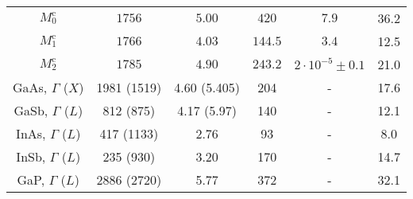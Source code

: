 \begin{table}
\begin{tabularx}{1\textwidth}{cccccc}
		\midrule
		
		
		$M_0^\mathrm{c}$& $1756$ & $5.00$& $420$& $7.9$&36.2\\
		$M_1^\mathrm{c}$& $1766$ & $4.03$& $144.5$& $3.4$&12.5\\
		$M_2^\mathrm{c}$ & $1785$ & $4.90$& $243.2$& $2\cdot 10^{-5}\pm0.1$&21.0\\%
		\midrule
		GaAs, $\Gamma$ ($X$)& 1981 (1519)& 4.60 (5.405)& 204& -&17.6\\
		GaSb, $\Gamma$ ($L$)& 812 (875)& 4.17 (5.97)& 140& -&12.1\\
		InAs, $\Gamma$ ($L$)& 417 (1133)& 2.76& 93& -&8.0\\
		InSb, $\Gamma$ ($L$)& 235 (930)& 3.20& 170& -&14.7\\
		GaP, $\Gamma$ ($L$)& 2886 (2720)& 5.77& 372& -&32.1\\
		\bottomrule
	\end{tabularx}\label{tab:Varshni}
\end{table}

